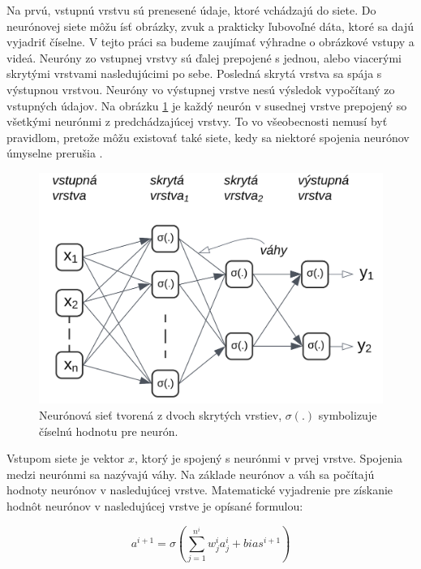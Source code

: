 Na prvú, vstupnú vrstvu sú prenesené údaje, ktoré vchádzajú do siete. Do neurónovej siete môžu ísť obrázky, zvuk a prakticky ľubovoľné dáta, ktoré sa dajú vyjadriť číselne. V tejto práci sa budeme zaujímať výhradne o obrázkové vstupy a videá. Neuróny zo vstupnej vrstvy sú ďalej prepojené s jednou, alebo viacerými skrytými vrstvami nasledujúcimi po sebe. Posledná skrytá vrstva sa spája s výstupnou vrstvou. Neuróny vo výstupnej vrstve nesú výsledok vypočítaný zo vstupných údajov. Na obrázku \ref{img:network} je každý neurón v susednej vrstve prepojený so všetkými neurónmi z predchádzajúcej vrstvy. To vo všeobecnosti nemusí byť pravidlom, pretože môžu existovať také siete, kedy sa niektoré spojenia neurónov úmyselne prerušia \cite{DettmersTim2019SNfS}. 
\\
\begin{figure}[ht]
    \centering
    \includegraphics[width=.6\textwidth]{images/02/mynn.png}
    \caption{Neurónová sieť tvorená z dvoch skrytých vrstiev, \begin{math}\sigma(.)\end{math} symbolizuje číselnú hodnotu pre neurón. }
    \label{img:network}
\end{figure}

Vstupom siete je vektor \begin{math}x\end{math}, ktorý je spojený s neurónmi v prvej vrstve. Spojenia medzi neurónmi sa nazývajú váhy. Na základe neurónov a váh sa počítajú hodnoty neurónov v nasledujúcej vrstve. Matematické vyjadrenie pre získanie hodnôt neurónov v nasledujúcej vrstve je opísané formulou:

\begingroup
\large
\begin{equation}a^{i+1} = \sigma \left ( \sum_{j=1}^{n^i} w_{j}^i a_{j}^i + bias^{i+1} \right ) \end{equation}
\endgroup
 
